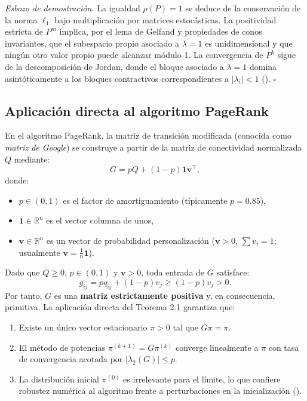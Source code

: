 \documentclass[
  spanish,
  us-letterpaper,
]{scrreprt}
\providecommand{\tightlist}{%
  \setlength{\itemsep}{0pt}\setlength{\parskip}{0pt}}
\numberwithin{equation}{section}
\begin{document}
\emph{Esbozo de demostración.} La igualdad \(\rho(P)=1\) se deduce de la
conservación de la norma \(\ell_1\) bajo multiplicación por matrices
estocásticas. La positividad estricta de \(P^m\) implica, por el lema de
Gelfand y propiedades de conos invariantes, que el subespacio propio
asociado a \(\lambda=1\) es unidimensional y que ningún otro valor
propio puede alcanzar módulo 1. La convergencia de \(P^k\) sigue de la
descomposición de Jordan, donde el bloque asociado a \(\lambda=1\)
domina asintóticamente a los bloques contractivos correspondientes a
\(|\lambda_i| < 1\) ().
\(\square\)

\subsection{Aplicación directa al algoritmo
PageRank}\label{sec-pagerank}

En el algoritmo PageRank, la matriz de transición modificada (conocida
como \emph{matriz de Google}) se construye a partir de la matriz de
conectividad normalizada \(Q\) mediante: \[
G = pQ + (1-p)\mathbf{1}\mathbf{v}^\top,
\] donde:

\begin{itemize}
\tightlist
\item
  \(p \in (0,1)\) es el factor de amortiguamiento (típicamente
  \(p=0.85\)),
\item
  \(\mathbf{1} \in \mathbb{R}^n\) es el vector columna de unos,
\item
  \(\mathbf{v} \in \mathbb{R}^n\) es un vector de probabilidad
  personalización (\(\mathbf{v} > 0\), \(\sum v_i = 1\); usualmente
  \(\mathbf{v} = \frac{1}{n}\mathbf{1}\)).
\end{itemize}

Dado que \(Q \geq 0\), \(p \in (0,1)\) y \(\mathbf{v} > 0\), toda
entrada de \(G\) satisface: \[
g_{ij} = p q_{ij} + (1-p) v_j \geq (1-p)v_j > 0.
\] Por tanto, \(G\) es una \textbf{matriz estrictamente positiva} y, en
consecuencia, primitiva. La aplicación directa del Teorema 2.1 garantiza
que:

\begin{enumerate}
\def\labelenumi{\arabic{enumi}.}
\tightlist
\item
  Existe un único vector estacionario \(\pi > 0\) tal que
  \(G\pi = \pi\).
\item
  El método de potencias \(\pi^{(k+1)} = G\pi^{(k)}\) converge
  linealmente a \(\pi\) con tasa de convergencia acotada por
  \(|\lambda_2(G)| \leq p\).
\item
  La distribución inicial \(\pi^{(0)}\) es irrelevante para el límite,
  lo que confiere robustez numérica al algoritmo frente a perturbaciones
  en la inicialización ().
\end{enumerate}
\end{document}
